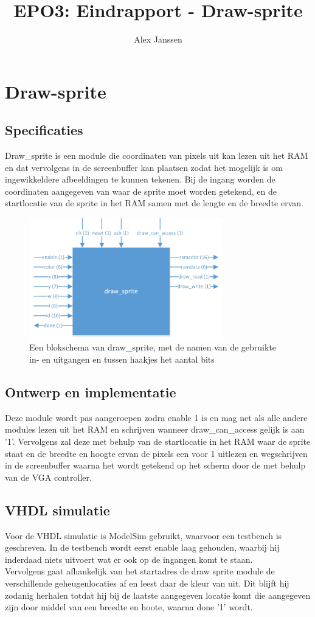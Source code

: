 \documentclass{scrartcl} %
\author{Alex Janssen}
\title{EPO3: Eindrapport - Draw-sprite}
\begin{document}
\section{Draw-sprite}
\label{sec:draw-sprite}

\subsection{Specificaties}
Draw\_sprite is een module die coordinaten van pixels uit kan lezen uit het RAM en dat vervolgens in de screenbuffer kan plaatsen zodat het mogelijk is om ingewikkeldere afbeeldingen te kunnen tekenen. Bij de ingang worden de coordinaten aangegeven van waar de sprite moet worden getekend, en de startlocatie van de sprite in het RAM samen met de lengte en de breedte ervan.

\begin{figure}[H]
	\centering
	\includegraphics[width=0.75\textwidth]{resource/draw_sprite.png}
	\caption{Een blokschema van draw\_sprite, met de namen van de gebruikte in- en uitgangen en tussen haakjes het aantal bits}
	\label{fig:draw-line-schema}
\end{figure}

\subsection{Ontwerp en implementatie}
Deze module wordt pas aangeroepen zodra enable 1 is en mag net als alle andere modules lezen uit het RAM en schrijven wanneer draw\_can\_access gelijk is aan '1'. Vervolgens zal deze met behulp van de startlocatie in het RAM waar de sprite staat en de breedte en hoogte ervan de pixels een voor 1 uitlezen en wegschrijven in de screenbuffer waarna het wordt getekend op het scherm door de met behulp van de VGA controller.

\subsection{VHDL simulatie}
Voor de VHDL simulatie is ModelSim gebruikt, waarvoor een testbench is geschreven. In de testbench wordt eerst enable laag gehouden, waarbij hij inderdaad niets uitvoert wat er ook op de ingangen komt te staan.\\
Vervolgens gaat afhankelijk van het startadres de draw sprite module de verschillende geheugenlocaties af en leest daar de kleur van uit. Dit blijft hij zodanig herhalen totdat hij bij de laatste aangegeven locatie komt die aangegeven zijn door middel van een breedte en hoote, waarna done '1' wordt.
\end{document}
